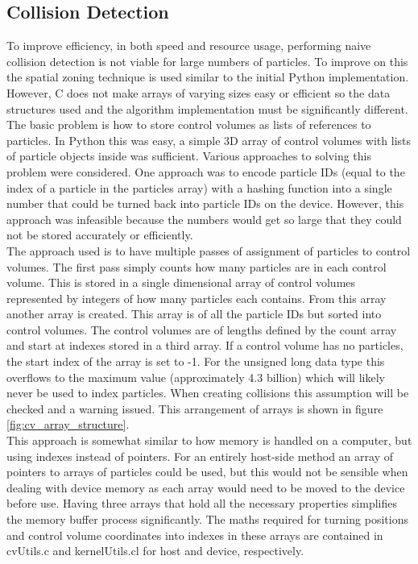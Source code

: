 \documentclass[10pt,a4paper,titlepage]{report}
\begin{document}
\subsection{Collision Detection}
To improve efficiency, in both speed and resource usage, performing naive collision detection is not viable for large numbers of particles. To improve on this the spatial zoning technique is used similar to the initial Python implementation. However, C does not make arrays of varying sizes easy or efficient so the data structures used and the algorithm implementation must be significantly different.
\\The basic problem is how to store control volumes as lists of references to particles. In Python this was easy, a simple 3D array of control volumes with lists of particle objects inside was sufficient. Various approaches to solving this problem were considered. One approach was to encode particle IDs (equal to the index of a particle in the particles array) with a hashing function into a single number that could be turned back into particle IDs on the device. However, this approach was infeasible because the numbers would get so large that they could not be stored accurately or efficiently.
\\The approach used is to have multiple passes of assignment of particles to control volumes. The first pass simply counts how many particles are in each control volume. This is stored in a single dimensional array of control volumes represented by integers of how many particles each contains. From this array another array is created. This array is of all the particle IDs but sorted into control volumes. The control volumes are of lengths defined by the count array and start at indexes stored in a third array. If a control volume has no particles, the start index of the array is set to -1. For the unsigned long data type this overflows to the maximum value (approximately 4.3 billion) which will likely never be used to index particles. When creating collisions this assumption will be checked and a warning issued. This arrangement of arrays is shown in figure \ref{fig:cv_array_structure}.
\\This approach is somewhat similar to how memory is handled on a computer, but using indexes instead of pointers. For an entirely host-side method an array of pointers to arrays of particles could be used, but this would not be sensible when dealing with device memory as each array would need to be moved to the device before use. Having three arrays that hold all the necessary properties simplifies the memory buffer process significantly. The maths required for turning positions and control volume coordinates into indexes in these arrays are contained in cvUtils.c and kernelUtils.cl for host and device, respectively.
\end{document}
